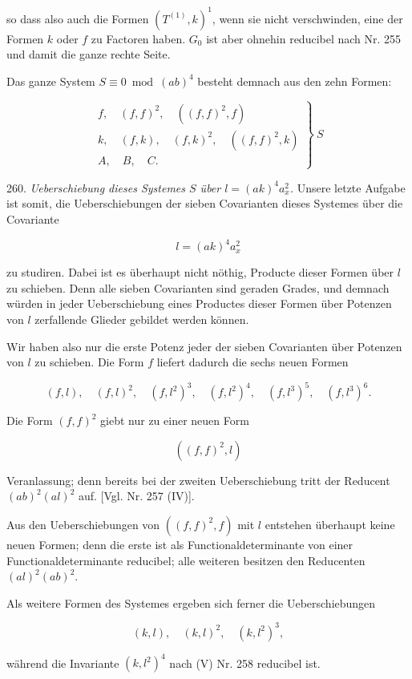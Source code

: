 so dass also auch die Formen $(T^{(1)}, k)^1$, wenn sie nicht verschwinden,
eine der Formen $k$ oder $f$ zu Factoren haben. $G_0$ ist aber ohnehin
reducibel nach Nr. 255 und damit die ganze rechte Seite.


Das ganze System $S \equiv 0 \bmod (ab)^4$ besteht demnach aus den
zehn Formen:

\[
\left.
\begin{array}{l}
f, \quad (f, f)^2, \quad ((f, f)^2, f)\\[2pt]
k, \quad (f, k), \quad (f, k)^2, \quad ((f, f)^2, k)\\[2pt]
A, \quad B, \quad C.
\end{array}
\right\}\ S
\]

260. \textit{Ueberschiebung dieses Systemes $S$ über $l = (ak)^4 a_x^2$.} Unsere
letzte Aufgabe ist somit, die Ueberschiebungen der sieben Covarianten
dieses Systemes über die Covariante

\[
l = (ak)^4 a_x^2
\]

zu studiren. Dabei ist es überhaupt nicht nöthig, Producte dieser
Formen über $l$ zu schieben. Denn alle sieben Covarianten sind geraden
 Grades, und demnach würden in jeder Ueberschiebung eines Productes
 dieser Formen über Potenzen von $l$ zerfallende Glieder gebildet
 werden können.

Wir haben also nur die erste Potenz jeder der sieben Covarianten
über Potenzen von $l$ zu schieben.
Die Form $f$ liefert dadurch die sechs neuen Formen

\[
(f, l), \quad (f, l)^2, \quad (f, l^2)^3, \quad (f, l^2)^4, \quad (f, l^3)^5, \quad (f, l^3)^6.
\]

Die Form $(f, f)^2$ giebt nur zu einer neuen Form

\[
((f, f)^2, l)
\]

Veranlassung; denn bereits bei der zweiten Ueberschiebung tritt der
Reducent $(ab)^2 (al)^2$ auf. [Vgl. Nr. 257 (IV)].

Aus den Ueberschiebungen von $((f, f)^2, f)$ mit $l$ entstehen überhaupt
 keine neuen Formen; denn die erste ist als Functionaldeterminante
 von einer Functionaldeterminante reducibel; alle weiteren besitzen
 den Reducenten $(al)^2 (ab)^2$.

Als weitere Formen des Systemes ergeben sich ferner die Ueberschiebungen


\[
(k, l), \quad (k, l)^2, \quad (k, l^2)^3,
\]

während die Invariante $(k, l^2)^4$ nach (V) Nr. 258 reducibel ist.


